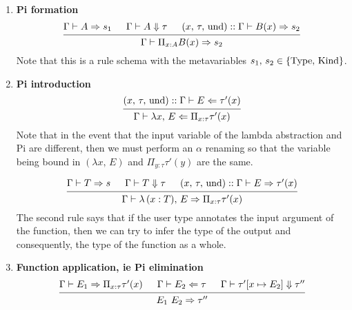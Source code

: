 \documentclass{article}
\begin{document}
\begin{definition} 
\begin{enumerate}
  \item \textbf{Pi formation} \\
    \[
      \begin{prooftree}
        \hypo{\Gamma \vdash A \Rightarrow s_1}
        \hypo{\Gamma \vdash A \Downarrow \tau}
        \hypo{(x, \, \tau, \, \text{und}) :: \Gamma \vdash B(x) \Rightarrow s_2}
        \infer3{\Gamma \vdash \Pi_{x : A}B(x) \Rightarrow s_2}
      \end{prooftree}
    \]
    Note that this is a rule schema with the metavariables 
    $s_1, \, s_2 \in \{\operatorname{Type}, \, \operatorname{Kind}\}$.


  \item \textbf{Pi introduction} \\
    \[
      \begin{prooftree}
        \hypo{(x, \, \tau, \, \text{und}) :: \Gamma \vdash E \Leftarrow \tau'(x)}
        \infer1{\Gamma \vdash \lambda x, \, E \Leftarrow \Pi_{x : \tau}\tau'(x)}
      \end{prooftree}
    \]
    Note that in the event that the input variable of the lambda abstraction and
    Pi are different, then we must perform an $\alpha$ renaming so that the
    variable being bound in $(\lambda x, \, E)$ and $\Pi_{y : \tau} \tau'(y)$
    are the same.

    \[
      \begin{prooftree}
        \hypo{\Gamma \vdash T \Rightarrow s}
        \hypo{\Gamma \vdash T \Downarrow \tau}
        \hypo{(x, \, \tau, \, \text{und}) :: \Gamma \vdash E \Rightarrow \tau'(x)}
        \infer3{\Gamma \vdash \lambda \, (x : T), \, E \Rightarrow \Pi_{x : \tau}\tau'(x)}
      \end{prooftree}
    \]
    The second rule says that if the user type annotates the input argument of
    the function, then we can try to infer the type of the output and
    consequently, the type of the function as a whole.

  \item \textbf{Function application, ie Pi elimination} \\
    \[
      \begin{prooftree}
        \hypo{\Gamma \vdash E_1 \Rightarrow \Pi_{x : \tau}\tau'(x)}
        \hypo{\Gamma \vdash E_2 \Leftarrow \tau}
        \hypo{\Gamma \vdash \tau'[x \mapsto E_2] \Downarrow \tau''}
        \infer3{E_1 \,\, E_2 \Rightarrow \tau''}
      \end{prooftree}
    \]


\end{enumerate}
\end{definition}
\end{document}

